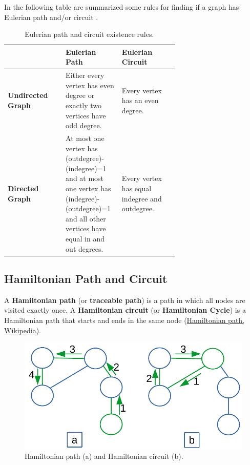 In the following table are summarized some rules for finding if a graph has Eulerian path and/or circuit \cite{eulerpathcircuit}.

\begin{table}[H]
	\caption[Eulerian path and circuit existence rules.]{Eulerian path and circuit existence rules.}
	\label{eulerpathcircuit}
	\centering
	\begin{tabular}{| l | p{0.33\linewidth} | p{0.33\linewidth} |}
		\hline
 			& \textbf{Eulerian Path} & \textbf{Eulerian Circuit} \\
		\hline
		\textbf{Undirected Graph} & Either every vertex has even degree or exactly two vertices have odd degree. &  Every vertex has an even degree. \\
		\hline
		\textbf{Directed Graph} & At most one vertex has \newline (outdegree)-(indegree)=1 and at most one vertex has \newline (indegree)-(outdegree)=1 and all other vertices have equal in and out degrees. & Every vertex has equal indegree and outdegree. \\
		\hline
	\end{tabular}
\end{table}

\subsection{Hamiltonian Path and Circuit}
A \textbf{Hamiltonian path} (or \textbf{traceable path}) is a path in which all nodes are visited exactly once. A \textbf{Hamiltonian circuit} (or \textbf{Hamiltonian Cycle}) is a Hamiltonian path that starts and ends in the same node \cite{wikihamiltoninanpathcircuit} (\href{https://en.wikipedia.org/wiki/Hamiltonian_path}{Hamiltonian path, Wikipedia}).

\begin{figure}[H]
	\begin{center}
		\includegraphics[scale=.6]{chapters/graphs/images/graphs_10.pdf}
		\caption[Hamiltonian path (a) and Hamiltonian circuit (b).]{Hamiltonian path (a) and Hamiltonian circuit (b).}
		\label{graphs_10}
	\end{center}
\end{figure}

